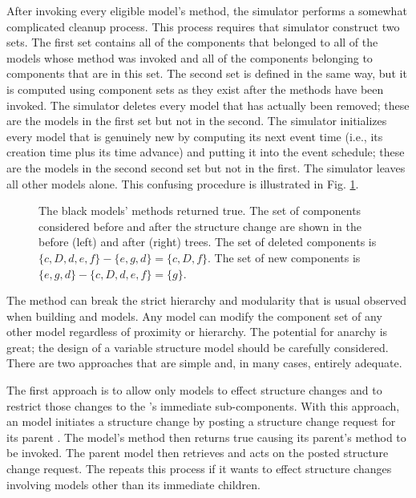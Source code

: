 After invoking every eligible model's  method, the simulator performs a somewhat complicated cleanup process. This process requires that simulator construct two sets. The first set contains all of the components that belonged to all of the  models whose  method was invoked and all of the components belonging to components that are in this set. The second set is defined in the same way, but it is computed using component sets as they exist after the  methods have been invoked. The simulator deletes every model that has actually been removed; these are the models in the first set but not in the second. The simulator initializes every model that is genuinely new by computing its next event time (i.e., its creation time plus its time advance) and putting it into the event schedule; these are the models in the second second set but not in the first. The simulator leaves all other models alone. This confusing procedure is illustrated in Fig. \ref{fig:set_defns}.
\begin{figure}[ht]
\centering
{}
\caption{The black models'  methods returned true. The set of components considered before and after the structure change are shown in the before (left) and after (right) trees. The set of deleted components is $\{c,D,d,e,f\}-\{e,g,d\} = \{c,D,f\}$. The set of new components is $\{e,g,d\} - \{c,D,d,e,f\} = \{g\}$.}
\label{fig:set_defns}
\end{figure}

The  method can break the strict hierarchy and modularity that is usual observed when building  and  models. Any  model can modify the component set of any other model regardless of proximity or hierarchy. The potential for anarchy is great; the design of a variable structure model should be carefully considered. There are two approaches that are simple and, in many cases, entirely adequate.

The first approach is to allow only  models to effect structure changes and to restrict those changes to the 's immediate sub-components. With this approach, an  model initiates a structure change by posting a structure change request for its parent . The  model's  method then returns true causing its parent's  method to be invoked. The parent  model then retrieves and acts on the posted structure change request. The  repeats this process if it wants to effect structure changes involving models other than its immediate children.

